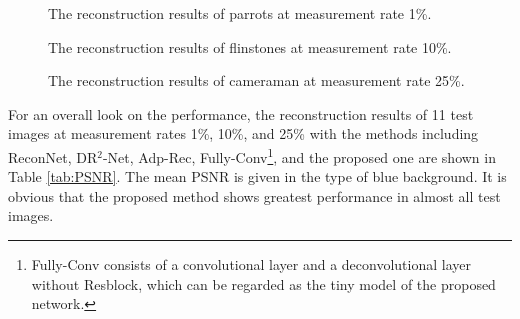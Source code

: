 \documentclass[review]{elsarticle}
\begin{document}
\begin{figure}[h!]
	\centering
	 \qquad
	 \qquad
	 \qquad
	\caption{The reconstruction results of parrots at measurement rate 1\%.}
	\label{fig:Parrots}
\end{figure}
\begin{figure}[h!]
	\centering
	 \qquad
	 \qquad
	 \qquad
	\caption{The reconstruction results of flinstones at measurement rate 10\%.}
	\label{fig:Flinstones}
\end{figure}
\begin{figure}[h!]
	\centering
	 \qquad
	 \qquad
	 \qquad
	\caption{The reconstruction results of cameraman at measurement rate 25\%.}
	\label{fig:Cameraman}
\end{figure}
\newpage
For an overall look on the performance, the reconstruction results of 11 test images at measurement rates 1\%, 10\%, and 25\% with the methods including ReconNet, DR$^2$-Net, Adp-Rec, Fully-Conv\footnote{Fully-Conv consists of a convolutional layer and a deconvolutional layer without Resblock, which can be regarded as the tiny model of the proposed network.}, and the proposed one are shown in Table \ref{tab:PSNR}. The mean PSNR is given in the type of blue background. It is obvious that the proposed method shows greatest performance in almost all test images.
\end{document}
